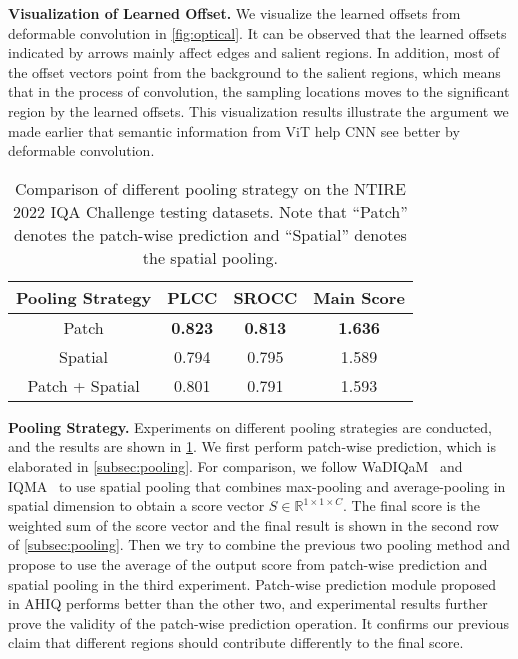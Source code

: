 \documentclass[10pt,twocolumn,letterpaper]{article}
\begin{document}
\vspace{2pt}
\noindent\textbf{Visualization of Learned Offset.} We visualize the learned offsets from deformable convolution in \cref{fig:optical}. It can be observed that the learned offsets indicated by arrows mainly affect edges and salient regions. In addition, most of the offset vectors point from the background to the salient regions, which means that in the process of convolution, the sampling locations moves to the significant region by the learned offsets. This visualization results illustrate the argument we made earlier that semantic information from ViT help CNN see better by deformable convolution.

\begin{table}[ht]
\centering
\caption{Comparison of different pooling strategy on the NTIRE 2022 IQA Challenge testing datasets. Note that ``Patch'' denotes the patch-wise prediction and ``Spatial'' denotes the spatial pooling.}
\begin{tabular}{cccc}
\toprule[1.2pt]
Pooling Strategy & PLCC & SROCC & Main Score \\ \hline
Patch & \textbf{0.823} & \textbf{0.813} & \textbf{1.636} \\
Spatial & 0.794 & 0.795 & 1.589 \\
Patch + Spatial & 0.801 & 0.791 &  1.593\\ \toprule[1.2pt]
\end{tabular}
\label{tab:pooling}
\end{table}


\vspace{2pt}
\noindent\textbf{Pooling Strategy.} Experiments on different pooling strategies are conducted, and the results are shown in \cref{tab:pooling}. We first perform patch-wise prediction, which is elaborated in \cref{subsec:pooling}. For comparison, we follow WaDIQaM~\cite{bosse2017deep} and IQMA~\cite{guo2021iqma} to use spatial pooling that combines max-pooling and average-pooling in spatial dimension to obtain a score vector $S\in \mathbb{R}^{1\times 1 \times C}$. The final score is the weighted sum of the score vector and the final result is shown in the second row of \cref{subsec:pooling}. Then we try to combine the previous two pooling method and propose to use the average of the output score from patch-wise prediction and spatial pooling in the third experiment. Patch-wise prediction module proposed in AHIQ performs better than the other two, and experimental results further prove the validity of the patch-wise prediction operation. It confirms our previous claim that different regions should contribute differently to the final score.
\end{document}
